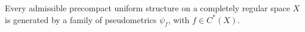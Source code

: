 Every admissible precompact uniform structure on a completely regular space $X$ is generated by a family of pseudometrics $\psi_f$, with $f \in C^*(X)$.
